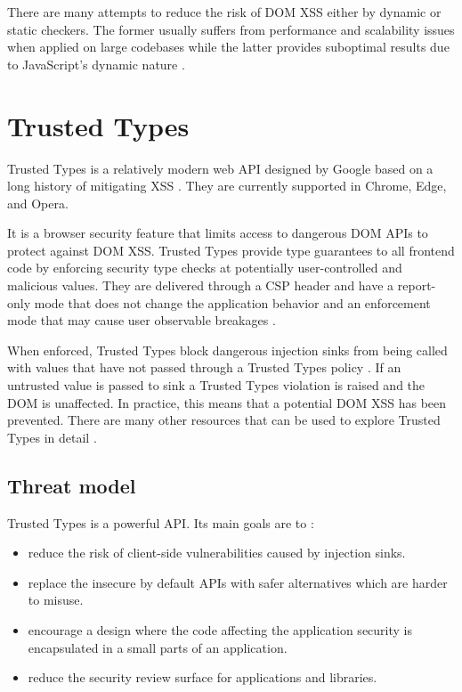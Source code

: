 There are many attempts to reduce the risk of DOM XSS either by dynamic or static checkers. The
former usually suffers from performance and scalability issues when applied on large codebases while
the latter provides suboptimal results due to JavaScript's dynamic nature
\cite{tt_web_framework_paper} \cite{owasp_xss_cheatsheet}.

\section{Trusted Types}

Trusted Types is a relatively modern web API designed by Google based on a long history of
mitigating XSS \cite{tt_design_history}. They are currently supported in Chrome, Edge, and Opera.

It is a browser security feature that limits access to dangerous DOM APIs to protect against DOM
XSS. Trusted Types provide type guarantees to all frontend code by enforcing security type checks at
potentially user-controlled and malicious values. They are delivered through a CSP header and have a
report-only mode that does not change the application behavior and an enforcement mode that may
cause user observable breakages \cite{tt_background}.

When enforced, Trusted Types block dangerous injection sinks from being called with values that have
not passed through a Trusted Types policy \cite{tt_background}. If an untrusted value is passed to
sink a Trusted Types violation is raised and the DOM is unaffected. In practice, this means that a
potential DOM XSS has been prevented. There are many other resources that can be used to explore
Trusted Types in detail \cite{tt_resources}.

\subsection{Threat model}

Trusted Types is a powerful API. Its main goals are to \cite{tt_spec:goals}:

\begin{itemize}
  \item reduce the risk of client-side vulnerabilities caused by injection sinks.
  \item replace the insecure by default APIs with safer alternatives which are harder to misuse.
  \item encourage a design where the code affecting the application security is encapsulated in a
        small parts of an application.
  \item reduce the security review surface for applications and libraries.
\end{itemize}

